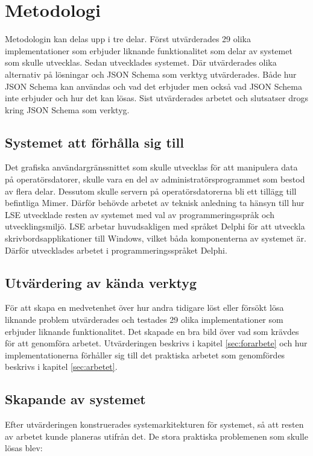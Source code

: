 \chapter{Metodologi}
\label{sec:metod}

Metodologin kan delas upp i tre delar. Först utvärderades 29 olika implementationer som erbjuder liknande funktionalitet som delar av systemet som skulle utvecklas. Sedan utvecklades systemet. Där utvärderades olika alternativ på lösningar och JSON Schema som verktyg utvärderades. Både hur JSON Schema kan användas och vad det erbjuder men också vad JSON Schema inte erbjuder och hur det kan lösas. Sist utvärderades arbetet och slutsatser drogs kring JSON Schema som verktyg.

\section{Systemet att förhålla sig till}
Det grafiska användargränssnittet som skulle utvecklas för att manipulera data på operatörsdatorer, skulle vara en del av administratörsprogrammet som bestod av flera delar. Dessutom skulle servern på operatörsdatorerna bli ett tillägg till befintliga Mimer. Därför behövde arbetet av teknisk anledning ta hänsyn till hur LSE utvecklade resten av systemet med val av programmeringsspråk och utvecklingsmiljö. LSE arbetar huvudsakligen med språket Delphi för att utveckla skrivbordsapplikationer till Windows, vilket båda komponenterna av systemet är. Därför utvecklades arbetet i programmeringsspråket Delphi.

\section{Utvärdering av kända verktyg}

För att skapa en medvetenhet över hur andra tidigare löst eller försökt lösa liknande problem utvärderades och testades 29 olika implementationer som erbjuder liknande funktionalitet. Det skapade en bra bild över vad som krävdes för att genomföra arbetet. Utvärderingen beskrivs i kapitel \ref{sec:forarbete} och hur implementationerna förhåller sig till det praktiska arbetet som genomfördes beskrivs i kapitel \ref{sec:arbetet}.

\section{Skapande av systemet}
Efter utvärderingen konstruerades systemarkitekturen för systemet, så att resten av arbetet kunde planeras utifrån det. De stora praktiska problemenen som skulle lösas blev:

